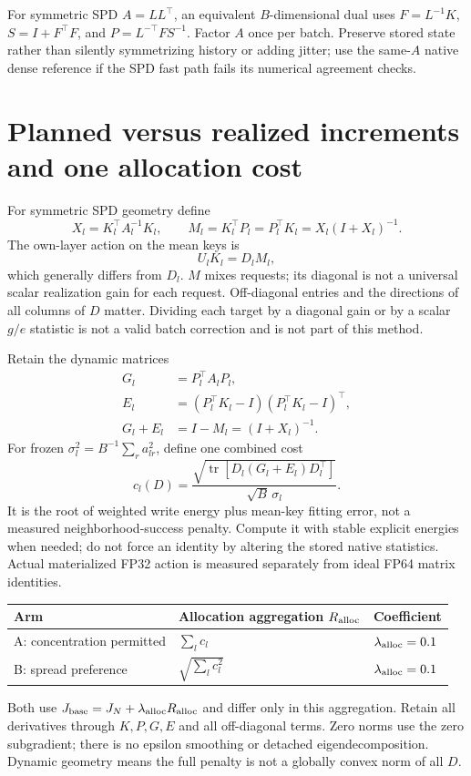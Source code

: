 \documentclass[10pt]{article}
\newcommand{\tr}{\operatorname{tr}}
\begin{document}
For symmetric SPD $A=LL^\top$, an equivalent $B$-dimensional dual uses
$F=L^{-1}K$, $S=I+F^\top F$, and $P=L^{-\top}F S^{-1}$.
Factor $A$ once per batch. Preserve stored state rather than silently
symmetrizing history or adding jitter; use the same-$A$ native dense
reference if the SPD fast path fails its numerical agreement checks.

\newpage
\section{Planned versus realized increments and one allocation cost}
For symmetric SPD geometry define
\[
 X_l=K_l^\top A_l^{-1}K_l,\qquad
 M_l=K_l^\top P_l=P_l^\top K_l=X_l(I+X_l)^{-1}.
\]
The own-layer action on the mean keys is
\[
 U_lK_l=D_lM_l,
\]
which generally differs from $D_l$. $M$ mixes requests; its diagonal is
not a universal scalar realization gain for each request. Off-diagonal
entries and the directions of all columns of $D$ matter. Dividing each
target by a diagonal gain or by a scalar $g/e$ statistic is not a valid
batch correction and is not part of this method.

Retain the dynamic matrices
\begin{align}
 G_l&=P_l^\top A_lP_l,\\
 E_l&=(P_l^\top K_l-I)(P_l^\top K_l-I)^\top,\\
 G_l+E_l&=I-M_l=(I+X_l)^{-1}.
\end{align}
For frozen $\sigma_l^2=B^{-1}\sum_ra_{lr}^2$, define one combined cost
\[
 c_l(D)=\frac{\sqrt{\tr[D_l(G_l+E_l)D_l^\top]}}
                   {\sqrt B\,\sigma_l}.
\]
It is the root of weighted write energy plus mean-key fitting error,
not a measured neighborhood-success penalty. Compute it with stable
explicit energies when needed; do not force an identity by altering
the stored native statistics. Actual materialized FP32 action is
measured separately from ideal FP64 matrix identities.

\begin{center}
\begin{tabular}{lll}
\toprule
Arm & Allocation aggregation $R_{\rm alloc}$ & Coefficient\\
\midrule
A: concentration permitted & $\sum_l c_l$ & $\lambda_{\rm alloc}=0.1$\\
B: spread preference & $\sqrt{\sum_l c_l^2}$ & $\lambda_{\rm alloc}=0.1$\\
\bottomrule
\end{tabular}
\end{center}
Both use $J_{\rm base}=J_N+\lambda_{\rm alloc}R_{\rm alloc}$ and
differ only in this aggregation. Retain all derivatives through $K,P,G,E$
and all off-diagonal terms. Zero norms use the zero subgradient; there
is no epsilon smoothing or detached eigendecomposition. Dynamic geometry
means the full penalty is not a globally convex norm of all $D$.
\end{document}
